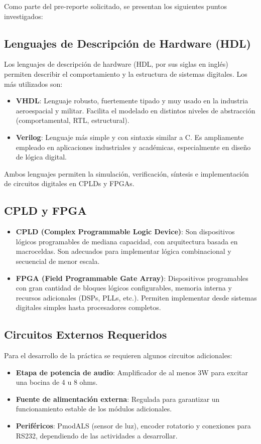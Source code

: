 
Como parte del pre-reporte solicitado, se presentan los siguientes puntos investigados:

\subsection*{Lenguajes de Descripción de Hardware (HDL)}
Los lenguajes de descripción de hardware (HDL, por sus siglas en inglés) permiten describir el comportamiento y la estructura de sistemas digitales. Los más utilizados son:
\begin{itemize}
    \item \textbf{VHDL}: Lenguaje robusto, fuertemente tipado y muy usado en la industria aeroespacial y militar. Facilita el modelado en distintos niveles de abstracción (comportamental, RTL, estructural).
    \item \textbf{Verilog}: Lenguaje más simple y con sintaxis similar a C. Es ampliamente empleado en aplicaciones industriales y académicas, especialmente en diseño de lógica digital.
\end{itemize}
Ambos lenguajes permiten la simulación, verificación, síntesis e implementación de circuitos digitales en CPLDs y FPGAs.

\subsection*{CPLD y FPGA}
\begin{itemize}
    \item \textbf{CPLD (Complex Programmable Logic Device)}: Son dispositivos lógicos programables de mediana capacidad, con arquitectura basada en macroceldas. Son adecuados para implementar lógica combinacional y secuencial de menor escala.
    \item \textbf{FPGA (Field Programmable Gate Array)}: Dispositivos programables con gran cantidad de bloques lógicos configurables, memoria interna y recursos adicionales (DSPs, PLLs, etc.). Permiten implementar desde sistemas digitales simples hasta procesadores completos.
\end{itemize}

\subsection*{Circuitos Externos Requeridos}
Para el desarrollo de la práctica se requieren algunos circuitos adicionales:
\begin{itemize}
    \item \textbf{Etapa de potencia de audio}: Amplificador de al menos 3W para excitar una bocina de 4 u 8 ohms.
    \item \textbf{Fuente de alimentación externa}: Regulada para garantizar un funcionamiento estable de los módulos adicionales.
    \item \textbf{Periféricos}: PmodALS (sensor de luz), encoder rotatorio y conexiones para RS232, dependiendo de las actividades a desarrollar.
\end{itemize}

